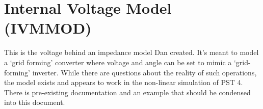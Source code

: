 \section{Internal Voltage Model (IVMMOD)}  
This is the voltage behind an impedance model Dan created.
It's meant to model a `grid forming' converter where voltage and angle can be set to mimic a `grid-forming' inverter.
While there are questions about the reality of such operations, the model exists and appears to work in the non-linear simulation  of PST 4.
There is pre-existing documentation and an example that should be condensed into this document.